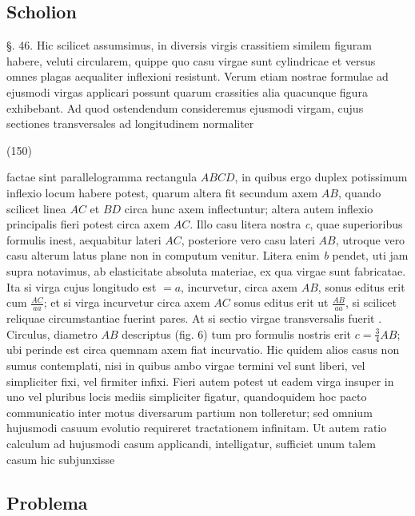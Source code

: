 \documentclass[11pt,a4paper]{article}
\begin{document}
\subsection{Scholion}

§. 46. Hic scilicet assumsimus, in diversis virgis crassitiem similem
figuram habere, veluti circularem, quippe quo casu virgae sunt cylindricae
et versus omnes plagas aequaliter inflexioni resistunt. Verum etiam
nostrae formulae ad ejusmodi virgas applicari possunt quarum crassities
alia quacunque figura exhibebant. Ad quod ostendendum consideremus ejusmodi
virgam, cujus sectiones transversales ad longitudinem normaliter

(150)

factae sint parallelogramma rectangula $ABCD$, in quibus ergo duplex
potissimum inflexio locum habere potest, quarum altera fit secundum axem
$AB$, quando scilicet linea $AC$ et $BD$ circa hunc axem inflectuntur; altera
autem inflexio principalis fieri potest circa axem $AC$. Illo casu litera
nostra \emph{c}, quae superioribus formulis inest, aequabitur lateri $AC$,
posteriore vero casu lateri $AB$, utroque vero casu alterum latus plane
non in computum venitur. Litera enim \emph{b} pendet, uti jam supra
notavimus, ab elasticitate absoluta materiae, ex qua virgae sunt
fabricatae. Ita si virga cujus longitudo est $=a$, incurvetur, circa
axem $AB$, sonus editus erit cum $\frac{AC}{aa}$; et si virga incurvetur circa
axem $AC$ sonus editus erit ut $\frac{AB}{aa}$, si scilicet reliquae circumstantiae
fuerint pares. At si sectio virgae transversalis fuerit \ill{} .
Circulus, diametro $AB$ descriptus (fig. 6) tum pro formulis nostris
erit $c=\frac{3}{4}AB$; ubi perinde est circa quemnam axem fiat incurvatio.
Hic quidem alios casus non sumus contemplati, nisi in quibus ambo
virgae termini vel sunt liberi, vel simpliciter fixi, vel firmiter infixi.
Fieri autem potest ut eadem virga insuper in uno vel pluribus locis
mediis simpliciter figatur, quandoquidem hoc pacto communicatio
inter motus diversarum partium non tolleretur; sed omnium
hujusmodi casuum evolutio requireret tractationem infinitam.
Ut autem ratio calculum ad hujusmodi casum applicandi, intelligatur,
sufficiet unum talem casum hic subjunxisse

\subsection{Problema}
\end{document}
